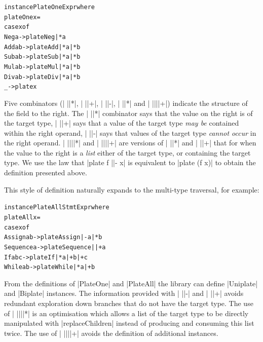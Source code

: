 \documentclass[preprint]{sigplanconf}
\newenvironment{code}{\begin{alltt}\small}{\end{alltt}}
\begin{document}

\begin{code}
instance PlateOne Expr where
    plateOne x =
        case x of
            Neg  a    -> plate Neg  |* a
            Add  a b  -> plate Add  |* a |* b
            Sub  a b  -> plate Sub  |* a |* b
            Mul  a b  -> plate Mul  |* a |* b
            Div  a b  -> plate Div  |* a |* b
            _         -> plate x
\end{code}

Five combinators (| ||*|, | ||+|, | ||-|, | ||*| and | ||||+|) indicate the structure of the field to the right. The | ||*| combinator says that the value on the right is of the target type, | ||+| says that a value of the target type \textit{may be} contained within the right operand, | ||-| says that values of the target type \textit{cannot occur} in the right operand. | ||||*| and | ||||+| are versions of | ||*| and | ||+| that for when the value to the right is a \textit{list} either of the target type, or containing the target type. We use the law that |plate f ||- x| is equivalent to |plate (f x)| to obtain the definition presented above.

This style of definition naturally expands to the multi-type traversal, for example:

\begin{code}
instance PlateAll Stmt Expr where
    plateAll x =
        case x of
            Assign    a b    -> plate Assign    |-   a |*  b
            Sequence  a      -> plate Sequence  ||+  a
            If        a b c  -> plate If        |*   a |+  b |+ c
            While     a b    -> plate While     |*   a |+  b
\end{code}

From the definitions of |PlateOne| and |PlateAll| the library can define |Uniplate| and |Biplate| instances. The information provided with | ||-| and | ||+| avoids redundant exploration down branches that do not have the target type. The use of | ||||*| is an optimisation which allows a list of the target type to be directly manipulated with |replaceChildren| instead of producing and consuming this list twice. The use of | ||||+| avoids the definition of additional instances.
\end{document}
